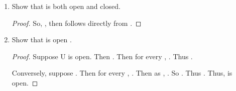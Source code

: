 \begin{enumerate}
\begin{enumerate}
\begin{proof}
                  Then, , . Thus, 

                  So, 
            \end{proof}

            \item Show that  \ioi {} is both open and closed.
            
            \begin{proof}
                  So, , then  follows directly from .
            \end{proof}

            \item Show that  is open \ioi {}.
            
            \begin{proof}
                  Suppose U is open. Then . Then for every , . Thus .

                  Conversely, suppose . Then for every , . Then as , . So . Thus . Thus,  is open.
            \end{proof}

      \end{enumerate}
\end{enumerate}

